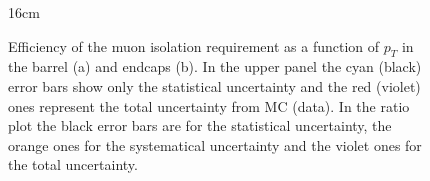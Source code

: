 \begin{figure}[hbtp]{16cm}
	\caption{Efficiency of the muon isolation requirement as a function of $p_{T}$ in the barrel (a) and endcaps (b). In the upper panel the cyan (black) error bars show only the statistical uncertainty and the red (violet) ones represent the total uncertainty from MC (data). In the ratio plot the black error bars are for the statistical uncertainty, the orange ones for the systematical uncertainty and the violet ones for the total uncertainty.}
	\centering
	\quad
	\label{fig:muon_iso_efficiency}
\end{figure}

